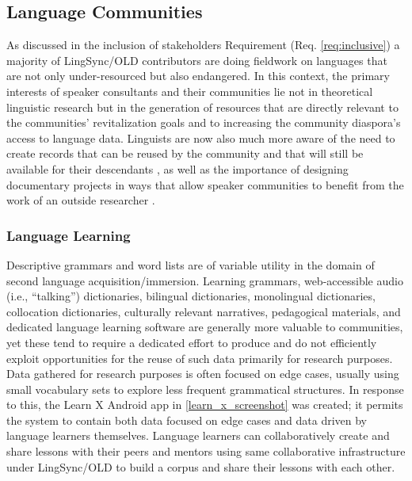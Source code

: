 \documentclass[11pt]{article}
\begin{document}
\subsection{Language Communities}\label{sec:lang-comunities}

As discussed in the inclusion of stakeholders Requirement (Req.
\autoref{req:inclusive}) a majority of LingSync/OLD contributors are doing
fieldwork on languages that are not only under-resourced but also endangered.
In this context, the primary interests of speaker consultants and their
communities lie not in theoretical linguistic research but in the generation of
resources that are directly relevant to the communities' revitalization goals
and to increasing the community diaspora's access to language data. Linguists
are now also much more aware of the need to create records that can be reused
by the community and that will still be available for their descendants
\cite[p.129]{Thieberger:2012}, as well as the importance of designing
documentary projects in ways that allow speaker communities to benefit from the
work of an outside researcher \cite{Good:2012}.


\subsubsection{Language Learning}

Descriptive grammars and word lists are of variable utility in the domain of
second language acquisition/immersion.  Learning grammars, web-accessible audio
(i.e., ``talking'') dictionaries, bilingual dictionaries, monolingual
dictionaries, collocation dictionaries, culturally relevant narratives,
pedagogical materials, and dedicated language learning software are generally
more valuable to communities, yet these tend to require a dedicated effort to
produce and do not efficiently exploit opportunities for the reuse of such data
primarily for research purposes.  Data gathered for research purposes is often
focused on edge cases, usually using small vocabulary sets to explore less
frequent grammatical structures. In response to this, the Learn X Android app
in \autoref{learn_x_screenshot} was created; it permits the system to contain
both data focused on edge cases and data driven by language learners
themselves. Language learners can collaboratively create and share lessons with
their peers and mentors using same collaborative infrastructure under
LingSync/OLD to build a corpus and share their lessons with each other.
\end{document}
